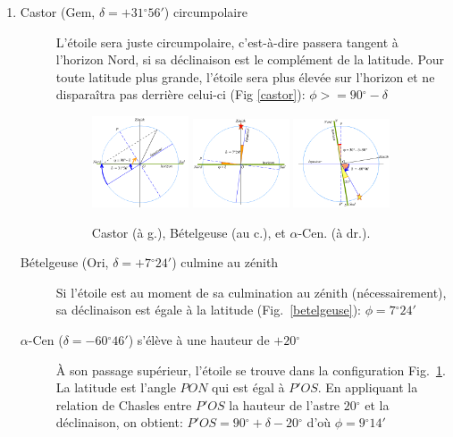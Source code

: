 \documentclass[a4paper,10pt]{report}
\renewcommand{\deg}{\ensuremath{^{\circ}}}
\begin{document}
\begin{Answer}
\begin{enumerate}
  \item
    \begin{description}
    \item[Castor (Gem, $\delta = +31\deg56'$) circumpolaire]
      L'étoile sera juste circumpolaire, c'est-à-dire passera tangent
      à l'horizon Nord, si sa déclinaison est le complément de la
      latitude.  Pour toute latitude plus grande, l'étoile sera plus
      élevée sur l'horizon et ne disparaîtra pas derrière celui-ci
      (Fig \ref{castor}): $\phi>=90\deg-\delta$
      \begin{figure}[htp]
        \centering
        \includegraphics[width=0.3\textwidth]{castor}
        \includegraphics[width=0.3\textwidth]{betelgeuse}
        \includegraphics[width=0.3\textwidth]{cen}
        \label{castor}
        \label{betelgeuse}
        \label{cen}
        \caption{Castor (à g.), Bételgeuse (au c.), et
          $\alpha$-Cen. (à dr.).}
      \end{figure}

    \item[Bételgeuse (Ori, $\delta = +7\deg24'$) culmine au zénith]
      Si l'étoile est au moment de sa culmination au zénith
      (nécessairement), sa déclinaison est égale à la latitude
      (Fig.~\ref{betelgeuse}): $\phi=7\deg24'$

    \item[$\alpha$-Cen ($\delta = - 60\deg46'$) s'élève à une
      hauteur de $+20\deg$] À son passage supérieur, l'étoile se
      trouve dans la configuration Fig.~\ref{cen}.  La latitude est
      l'angle $PON$ qui est égal à $P'OS$. En appliquant la relation
      de Chasles entre $P'OS$ la hauteur de l'astre $20\deg$ et la
      déclinaison, on obtient: $P'OS=90\deg+\delta-20\deg$ d'où
      $\phi = 9\deg14'$
    \end{description}
  \end{enumerate}
\end{Answer}
\end{document}
